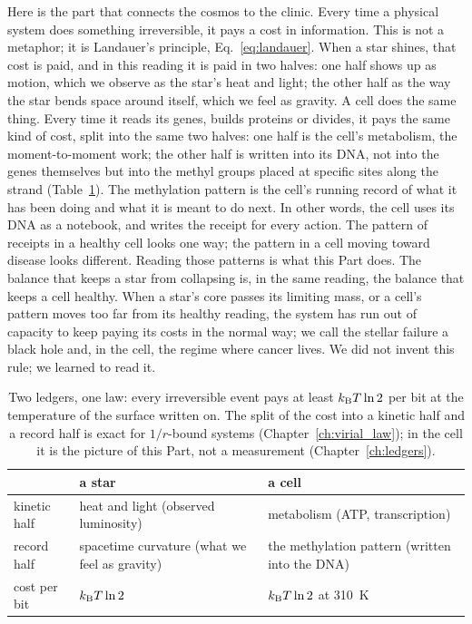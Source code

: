 Here is the part that connects the cosmos to the clinic. Every time a physical system does something irreversible, it pays a cost in
information. This is not a metaphor; it is Landauer's principle, Eq.~\eqref{eq:landauer}. \derived{} When a star shines, that cost is paid,
and in this reading it is paid in two halves: one half shows up as motion, which we observe as the star's heat and light; the other half as
the way the star bends space around itself, which we feel as gravity. A cell does the same thing. Every time it reads its genes, builds
proteins or divides, it pays the same kind of cost, split into the same two halves: one half is the cell's metabolism, the moment-to-moment
work; the other half is written into its DNA, not into the genes themselves but into the methyl groups placed at specific sites along the
strand (Table~\ref{tab:p4_twoledgers}). \conjecture{} The methylation pattern is the cell's running record of what it has been doing and
what it is meant to do next. In other words, the cell uses its DNA as a notebook, and writes the receipt for every action. The pattern of
receipts in a healthy cell looks one way; the pattern in a cell moving toward disease looks different. Reading those patterns is what this
Part does. \interp{} The balance that keeps a star from collapsing is, in the same reading, the balance that keeps a cell healthy. When a
star's core passes its limiting mass, or a cell's pattern moves too far from its healthy reading, the system has run out of capacity to
keep paying its costs in the normal way; we call the stellar failure a black hole and, in the cell, the regime where cancer lives. We did
not invent this rule; we learned to read it. \conjecture

\begin{table}[htbp]\centering\small
\caption{Two ledgers, one law: every irreversible event pays at least $k_{\mathrm B} T\ln2$ per bit at the temperature of the surface written on. The split of
the cost into a kinetic half and a record half is exact for $1/r$-bound systems (Chapter~\ref{ch:virial_law}); in the cell it is the
picture of this Part, not a measurement (Chapter~\ref{ch:ledgers}). \conjecture}\label{tab:p4_twoledgers}
\begin{tabularx}{\linewidth}{@{}l>{\raggedright\arraybackslash}X>{\raggedright\arraybackslash}X@{}}\toprule
 & a star & a cell \\\midrule
kinetic half & heat and light (observed luminosity) & metabolism (ATP, transcription) \\
record half & spacetime curvature (what we feel as gravity) & the methylation pattern (written into the DNA) \\
cost per bit & $k_{\mathrm B} T\ln2$ & $k_{\mathrm B} T\ln2$ at 310~K \\\bottomrule
\end{tabularx}
\end{table}


